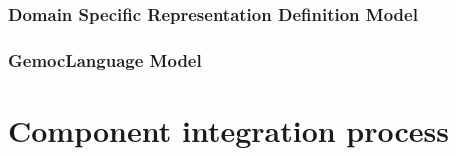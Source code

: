 \documentclass{gemoc} %
\begin{document}
\subsection{Domain Specific  Representation Definition Model}


\subsection{GemocLanguage Model}



\chapter{Component integration process}

\end{document}
